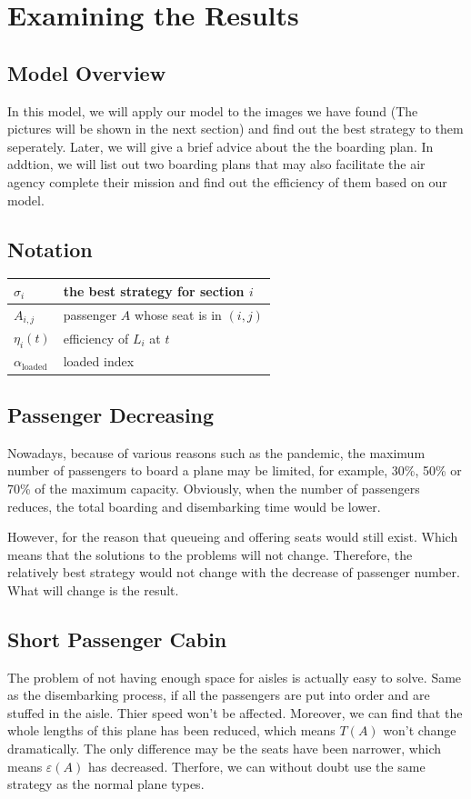 \documentclass{article}
\begin{document}
	\section{Examining the Results}
	\subsection{Model Overview}
	In this model, we will apply our model to the images we have found (The pictures will be shown in the next section) and find out the best strategy to them seperately. Later, we will give a brief advice about the the boarding plan. In addtion, we will list out two boarding plans that may also facilitate the air agency complete their mission and find out the efficiency of them based on our model.
	\subsection{Notation}
	\begin{center}
	\begin{tabular}{|l|l|}
		\hline
		$\sigma_i$&the best strategy for section $i$\\
		\hline
		$A_{i,j}$&passenger $A$ whose seat is in $\left(i,j\right)$\\
		\hline
		$\eta_i(t)$&efficiency of $L_i$ at $t$\\
		\hline
		$\alpha_\text{loaded}$&loaded index\\
		\hline
	\end{tabular}
	\end{center}
	\subsection{Passenger Decreasing}
	Nowadays, because of various reasons such as the pandemic, the maximum number of passengers to board a plane may be limited, for example, 30\%, 50\% or 70\% of the maximum capacity. Obviously, when the number of passengers reduces, the total boarding and disembarking time would be lower.

	However, for the reason that queueing and offering seats would still exist. Which means that the solutions to the problems will not change. Therefore, the relatively best strategy would not change with the decrease of passenger number.  What will change is the result.
	\subsection{Short Passenger Cabin}
	The problem of not having enough space for aisles is actually easy to solve. Same as the disembarking process, if all the passengers are put into order and  are stuffed in the aisle. Thier speed won't be affected. Moreover, we can find that the whole lengths of this plane has been reduced, which means $T(A)$ won't change dramatically. The only difference may be the seats have been narrower, which means $\varepsilon(A)$ has decreased. Therfore, we  can without doubt use the same strategy as the normal plane types.
\end{document}
